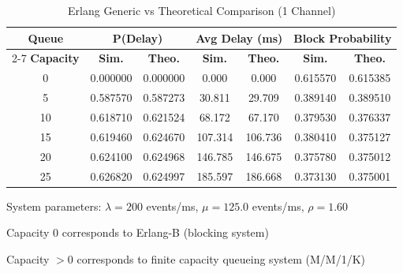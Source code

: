 
\begin{table}[htbp]
\centering
\caption{Erlang Generic vs Theoretical Comparison (1 Channel)}
\label{tab:erlang_comparison}
\begin{tabular}{|c|c|c|c|c|c|c|}
\hline
\multirow{2}{*}{\textbf{Queue}} & \multicolumn{2}{c|}{\textbf{P(Delay)}} & \multicolumn{2}{c|}{\textbf{Avg Delay (ms)}} & \multicolumn{2}{c|}{\textbf{Block Probability}} \\
\cline{2-7}
\textbf{Capacity} & \textbf{Sim.} & \textbf{Theo.} & \textbf{Sim.} & \textbf{Theo.} & \textbf{Sim.} & \textbf{Theo.} \\
\hline
0 & 0.000000 & 0.000000 & 0.000 & 0.000 & 0.615570 & 0.615385 \\
\hline
5 & 0.587570 & 0.587273 & 30.811 & 29.709 & 0.389140 & 0.389510 \\
\hline
10 & 0.618710 & 0.621524 & 68.172 & 67.170 & 0.379530 & 0.376337 \\
\hline
15 & 0.619460 & 0.624670 & 107.314 & 106.736 & 0.380410 & 0.375127 \\
\hline
20 & 0.624100 & 0.624968 & 146.785 & 146.675 & 0.375780 & 0.375012 \\
\hline
25 & 0.626820 & 0.624997 & 185.597 & 186.668 & 0.373130 & 0.375001 \\
\hline

\end{tabular}
\begin{tablenotes}
\small
\item System parameters: $\lambda = 200$ events/ms, $\mu = 125.0$ events/ms, $\rho = 1.60$
\item Capacity 0 corresponds to Erlang-B (blocking system)
\item Capacity $> 0$ corresponds to finite capacity queueing system (M/M/1/K)
\end{tablenotes}
\end{table}
